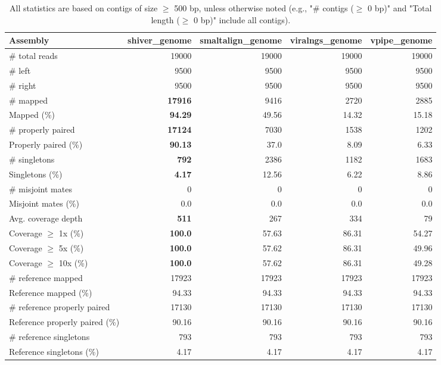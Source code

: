 \documentclass[12pt,a4paper]{article}
\begin{document}
\begin{table}[ht]
\begin{center}
\caption{All statistics are based on contigs of size $\geq$ 500 bp, unless otherwise noted (e.g., "\# contigs ($\geq$ 0 bp)" and "Total length ($\geq$ 0 bp)" include all contigs).}
\begin{tabular}{|l*{4}{|r}|}
\hline
Assembly & shiver\_genome & smaltalign\_genome & viralngs\_genome & vpipe\_genome \\ \hline
\# total reads & 19000 & 19000 & 19000 & 19000 \\ \hline
\# left & 9500 & 9500 & 9500 & 9500 \\ \hline
\# right & 9500 & 9500 & 9500 & 9500 \\ \hline
\# mapped & {\bf 17916} & 9416 & 2720 & 2885 \\ \hline
Mapped (\%) & {\bf 94.29} & 49.56 & 14.32 & 15.18 \\ \hline
\# properly paired & {\bf 17124} & 7030 & 1538 & 1202 \\ \hline
Properly paired (\%) & {\bf 90.13} & 37.0 & 8.09 & 6.33 \\ \hline
\# singletons & {\bf 792} & 2386 & 1182 & 1683 \\ \hline
Singletons (\%) & {\bf 4.17} & 12.56 & 6.22 & 8.86 \\ \hline
\# misjoint mates & 0 & 0 & 0 & 0 \\ \hline
Misjoint mates (\%) & 0.0 & 0.0 & 0.0 & 0.0 \\ \hline
Avg. coverage depth & {\bf 511} & 267 & 334 & 79 \\ \hline
Coverage $\geq$ 1x (\%) & {\bf 100.0} & 57.63 & 86.31 & 54.27 \\ \hline
Coverage $\geq$ 5x (\%) & {\bf 100.0} & 57.62 & 86.31 & 49.96 \\ \hline
Coverage $\geq$ 10x (\%) & {\bf 100.0} & 57.62 & 86.31 & 49.28 \\ \hline
\# reference mapped & 17923 & 17923 & 17923 & 17923 \\ \hline
Reference mapped (\%) & 94.33 & 94.33 & 94.33 & 94.33 \\ \hline
\# reference properly paired & 17130 & 17130 & 17130 & 17130 \\ \hline
Reference properly paired (\%) & 90.16 & 90.16 & 90.16 & 90.16 \\ \hline
\# reference singletons & 793 & 793 & 793 & 793 \\ \hline
Reference singletons (\%) & 4.17 & 4.17 & 4.17 & 4.17 \\ \hline

\end{tabular}
\end{center}
\end{table}
\end{document}
